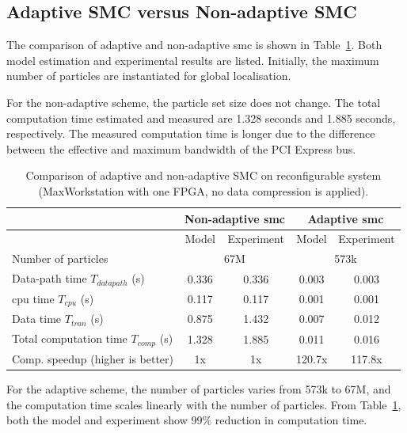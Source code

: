 \subsection{Adaptive SMC versus Non-adaptive SMC}
The comparison of adaptive and non-adaptive \gls{smc} is shown in Table~\ref{tab:smc}.
Both model estimation and experimental results are listed.
Initially, the maximum number of particles are instantiated for global localisation.

For the non-adaptive scheme, the particle set size does not change.
The total computation time estimated and measured are 1.328 seconds and 1.885 seconds, respectively.
The measured computation time is longer due to the difference between the effective and maximum bandwidth of the PCI Express bus.

\begin{table}[ht]
	\centering
	\setlength{\tabcolsep}{5pt}
	\begin{spacing}{1.0}
	\caption[Comparison of adaptive and non-adaptive SMC on reconfigurable system.]{Comparison of adaptive and non-adaptive SMC on reconfigurable system (MaxWorkstation with one FPGA, no data compression is applied).}
	\label{tab:smc}{
	\smallskip
		\begin{tabular}{l || c c | c c}
			\hline
			 \multirow{2}{*}{}  & \multicolumn{2}{c|}{Non-adaptive \gls{smc}} & \multicolumn{2}{c}{Adaptive \gls{smc}} \\
			\hline
			  & Model & Experiment & Model & Experiment \\
			\hline
			\hline
			 Number of particles & \multicolumn{2}{c|}{67M} & \multicolumn{2}{c}{573k} \\
			\hline
			 Data-path time $T_{datapath}$ (s) 		& 0.336 & 0.336 & 0.003 & 0.003 \\
			 \gls{cpu} time $T_{cpu}$ (s) 				& 0.117 & 0.117 & 0.001 & 0.001 \\
			 Data time $T_{tran}$ (s) 				& 0.875 & 1.432 & 0.007 & 0.012 \\
			 Total computation time $T_{comp}$ (s)			& 1.328 & 1.885 & 0.011	& 0.016 \\
			\hline
			 Comp. speedup (higher is better)		& 1x	& 1x	& 120.7x	& 117.8x \\
			\hline
		\end{tabular}
	}
	\end{spacing}
\end{table}

For the adaptive scheme, the number of particles varies from 573k to 67M, and the computation time scales linearly with the number of particles.
From Table~\ref{tab:smc}, both the model and experiment show 99\% reduction in computation time.

